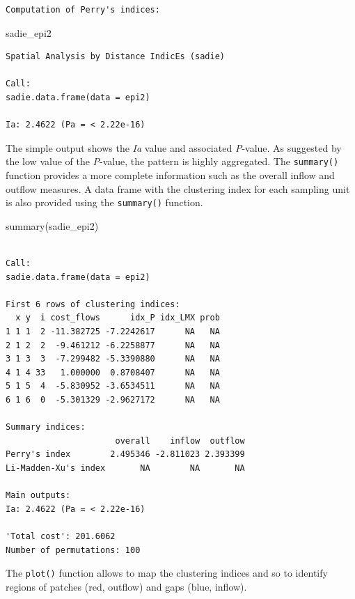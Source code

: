 \documentclass[
  letterpaper,
]{book}
\newenvironment{Shaded}{\begin{snugshade}}{\end{snugshade}}
\newcommand{\FunctionTok}[1]{\textcolor[rgb]{0.28,0.35,0.67}{#1}}
\newcommand{\NormalTok}[1]{\textcolor[rgb]{0.00,0.23,0.31}{#1}}
\begin{document}
\begin{verbatim}
Computation of Perry's indices:
\end{verbatim}

\begin{Shaded}
\begin{Highlighting}[]
\NormalTok{sadie\_epi2}
\end{Highlighting}
\end{Shaded}

\begin{verbatim}
Spatial Analysis by Distance IndicEs (sadie)

Call:
sadie.data.frame(data = epi2)

Ia: 2.4622 (Pa = < 2.22e-16)
\end{verbatim}

The simple output shows the \emph{Ia} value and associated
\emph{P}-value. As suggested by the low value of the \emph{P}-value, the
pattern is highly aggregated. The \texttt{summary()} function provides a
more complete information such as the overall inflow and outflow
measures. A data frame with the clustering index for each sampling unit
is also provided using the \texttt{summary()} function.

\begin{Shaded}
\begin{Highlighting}[]
\FunctionTok{summary}\NormalTok{(sadie\_epi2)}
\end{Highlighting}
\end{Shaded}

\begin{verbatim}

Call:
sadie.data.frame(data = epi2)

First 6 rows of clustering indices:
  x y  i cost_flows      idx_P idx_LMX prob
1 1 1  2 -11.382725 -7.2242617      NA   NA
2 1 2  2  -9.461212 -6.2258877      NA   NA
3 1 3  3  -7.299482 -5.3390880      NA   NA
4 1 4 33   1.000000  0.8708407      NA   NA
5 1 5  4  -5.830952 -3.6534511      NA   NA
6 1 6  0  -5.301329 -2.9627172      NA   NA

Summary indices:
                      overall    inflow  outflow
Perry's index        2.495346 -2.811023 2.393399
Li-Madden-Xu's index       NA        NA       NA

Main outputs:
Ia: 2.4622 (Pa = < 2.22e-16)

'Total cost': 201.6062
Number of permutations: 100
\end{verbatim}

The \texttt{plot()} function allows to map the clustering indices and so
to identify regions of patches (red, outflow) and gaps (blue, inflow).
\end{document}
